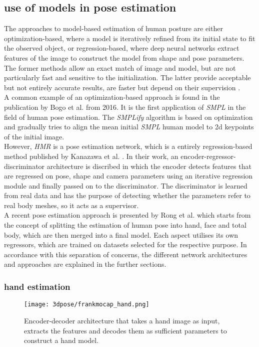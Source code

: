 \subsection{use of models in pose estimation}
The approaches to model-based estimation of human posture are either optimization-based, where a model is iteratively refined from its initial state to fit the observed object, or regression-based, where deep neural networks extract features of the image to construct the model from shape and pose parameters. The former methods allow an exact match of image and model, but are not particularly fast and sensitive to the initialization. The latter provide acceptable but not entirely accurate results, are faster but depend on their supervision \cite{spin}. \\
A common example of an optimization-based approach is found in the publication by Bogo et al. \cite{simplify} from 2016. It is the first application of \emph{SMPL} in the field of human pose estimation. The \emph{SMPLify} algorithm is based on optimization and gradually tries to align the mean initial \emph{SMPL} human model to 2d keypoints of the initial image. \\
However, \emph{HMR} is a pose estimation network, which is a entirely regression-based method published by Kanazawa et al. \cite{hmr}. In their work, an encoder-regressor-discriminator architecture is discribed in which the encoder detects features that are regressed on pose, shape and camera parameters using an iterative regression module and finally passed on to the discriminator. The discriminator is learned from real data and has the purpose of detecting whether the parameters refer to real body meshes, so it acts as a supervisor. \\
A recent pose estimation approach is presented by Rong et al. \cite{frankmocap} which starts from the concept of splitting the estimation of human pose into hand, face and total body, which are then merged into a final model. Each aspect utilises its own regressors, which are trained on datasets selected for the respective purpose. In accordance with this separation of concerns, the different network architectures and approaches are explained in the further sections.

\subsubsection{hand estimation}
\begin{figure}[h]
	\centering
	\texttt{[image: 3dpose/frankmocap\_hand.png]}
	\caption{Encoder-decoder architecture that takes a hand image as input, extracts the features and decodes them as sufficient parameters to construct a hand model.\cite{frankmocap}}
	\label{fig:frankmocap_hand}
\end{figure}

